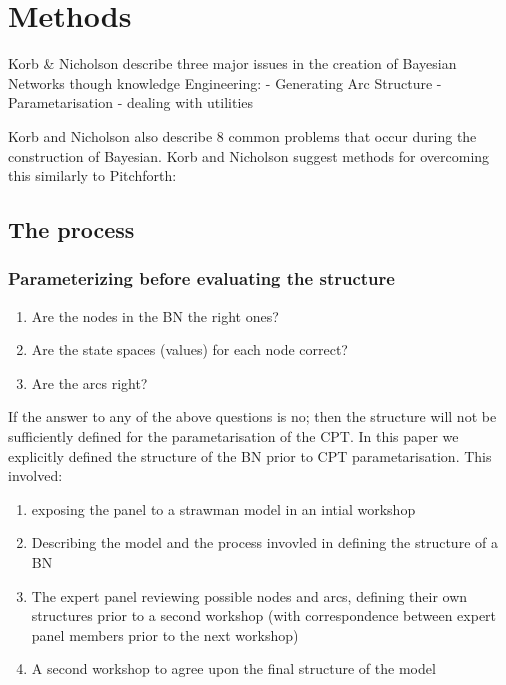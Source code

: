 \section{Methods}


Korb & Nicholson describe three major issues in the creation of Bayesian Networks though knowledge Engineering:
- Generating Arc Structure
- Parametarisation
- dealing with utilities

Korb and Nicholson also describe 8 common problems that occur during the construction of Bayesian. Korb and Nicholson suggest methods for overcoming this similarly to Pitchforth:
\subsection{The process}
\subsubsection{Parameterizing before evaluating the structure}
\begin{enumerate}
        \item Are the nodes in the BN the right ones?
        \item Are the state spaces (values) for each node correct?
        \item Are the arcs right?
\end{enumerate}
If the answer to any of the above questions is no; then the structure will not be sufficiently defined for the parametarisation of the CPT. In this paper we explicitly defined the structure of the BN prior to CPT parametarisation. This involved:
\begin{enumerate}
        \item exposing the panel to a strawman model in an intial workshop
        \item Describing the model and the process invovled in defining the structure of a BN
        \item The expert panel reviewing possible nodes and arcs, defining their own structures prior to a second workshop (with correspondence between expert panel members prior to the next workshop)
        \item A second workshop to agree upon the final structure of the model
\end{enumerate}
